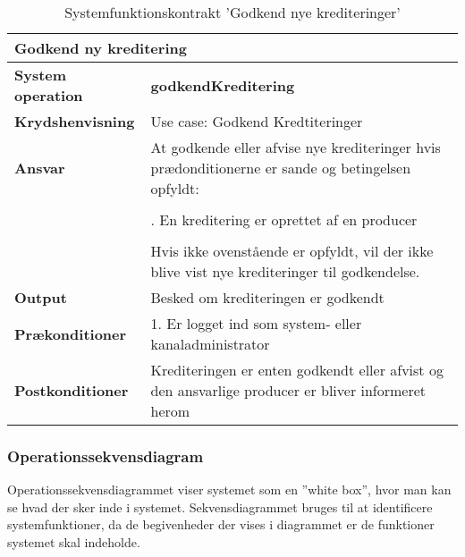 \begin{table}[ht]
    \begin{tabularx}{\textwidth}{|p{4cm}|X|}
        \hline
        \multicolumn{2}{|x|}{\textbf{Godkend ny kreditering}}\\
        \hline
        \textbf{System operation}       & \textbf{godkendKreditering} \\ \hline
        \textbf{Krydshenvisning}        & Use case: Godkend Kredtiteringer \\ \hline
        \textbf{Ansvar}                 & At godkende eller afvise nye krediteringer hvis prædonditionerne er sande og betingelsen opfyldt:  \\ 
                                        & \\
                                        & \quad 1. En kreditering er oprettet af en producer \\
                                        & \\
                                        & Hvis ikke ovenstående er opfyldt, vil der ikke blive vist nye krediteringer til godkendelse. \\ \hline
        \textbf{Output}                 & Besked om krediteringen er godkendt \\ \hline
        \textbf{Prækonditioner}         & 1. Er logget ind som system- eller kanaladministrator \\ \hline
        \textbf{Postkonditioner}        & Krediteringen er enten godkendt eller afvist og den ansvarlige producer er bliver informeret herom \\ \hline
    \end{tabularx}
    \caption{Systemfunktionskontrakt 'Godkend nye krediteringer'}
    \label{tab:kontrakter_Godkend_nye_krediteringer}
\end{table}



\subsubsection{Operationssekvensdiagram}
Operationssekvensdiagrammet viser systemet som en ”white box”, hvor man kan se hvad der sker
inde i systemet. Sekvensdiagrammet bruges til at identificere systemfunktioner, da de begivenheder der vises i
diagrammet er de funktioner systemet skal indeholde.

